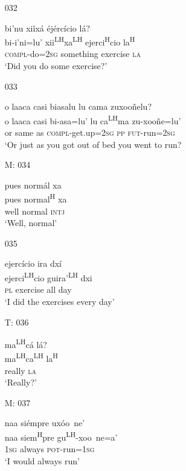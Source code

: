 \begin{itemize}
\item[032]
 
bi'nu xi\v{i}x\'{a} \'{e}j\'{e}rc\'{i}cio l\'{a}?\\
bi-i'ni=lu' xii\textsuperscript{LH}xa\textsuperscript{LH} ejerci\textsuperscript{H}cio la\textsuperscript{H}\\
\textsc{compl}-do=\textsc{2sg} something exercise \textsc{la}\\
\glt `Did you do some exercise?'
 
 

\item[033]
 
o laaca casi biasalu lu cama zuxoo\~{n}elu?\\
o laaca casi bi-asa=lu' lu ca\textsuperscript{LH}ma zu-xoo\~{n}e=lu'\\
or same as \textsc{compl}-get.up=\textsc{2sg} \textsc{pp} \textsc{fut}-run=\textsc{2sg}\\
\glt `Or just as you got out of bed you went to run?
 

\item[M: 034]
 

\glll   pues norm\'{a}l xa\\
pues normal\textsuperscript{H} xa\\
well normal \textsc{intj}\\
\glt `Well, normal'
 

\item[035]
 
\glll  ejerc\'{i}cio ira dx\'{i}\\
  ejerci\textsuperscript{LH}cio guira'\textsuperscript{LH} dxi\\
 \textsc{pl} exercise all day\\
\glt `I did the exercises every day'
 


\item[T: 036]
  
ma\textsuperscript{LH}c\'{a} l\'{a}?\\
ma\textsuperscript{LH}ca\textsuperscript{LH} la\textsuperscript{H}\\
really \textsc{la}\\
\glt `Really?'
  

\item[M: 037]
 
\glll   naa si\'{e}mpre ux\'{o}o~{n}e'\\
naa siem\textsuperscript{H}pre gu\textsuperscript{LH}-xoo~{n}e=a'\\
\textsc{1sg} always \textsc{pot}-run=\textsc{1sg}\\
\glt `I would always run'
 


\end{itemize}
